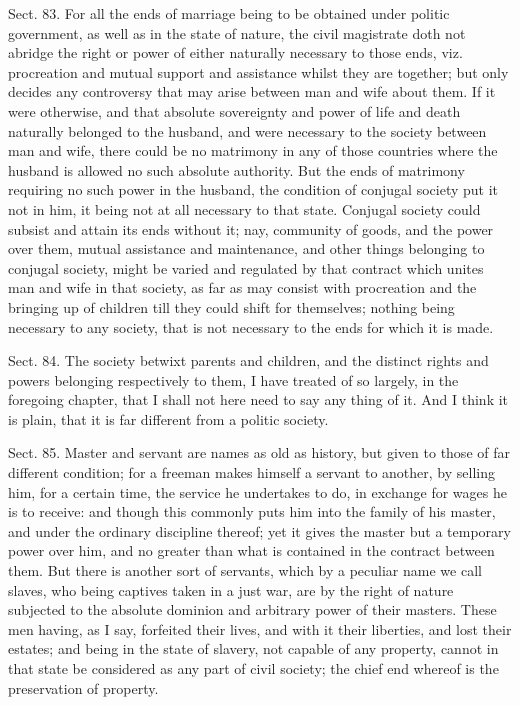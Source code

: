\documentclass[11pt,openany]{book}
\begin{document}
Sect. 83. For all the ends of marriage being to be obtained under politic government, as well as in the state of nature, the civil magistrate doth not abridge the right or power of either naturally necessary to those ends, viz. procreation and mutual support and assistance whilst they are together; but only decides any controversy that may arise between man and wife about them. If it were otherwise, and that absolute sovereignty and power of life and death naturally belonged to the husband, and were necessary to the society between man and wife, there could be no matrimony in any of those countries where the husband is allowed no such absolute authority. But the ends of matrimony requiring no such power in the husband, the condition of conjugal society put it not in him, it being not at all necessary to that state. Conjugal society could subsist and attain its ends without it; nay, community of goods, and the power over them, mutual assistance and maintenance, and other things belonging to conjugal society, might be varied and regulated by that contract which unites man and wife in that society, as far as may consist with procreation and the bringing up of children till they could shift for themselves; nothing being necessary to any society, that is not necessary to the ends for which it is made.

Sect. 84. The society betwixt parents and children, and the distinct rights and powers belonging respectively to them, I have treated of so largely, in the foregoing chapter, that I shall not here need to say any thing of it. And I think it is plain, that it is far different from a politic society.

Sect. 85. Master and servant are names as old as history, but given to those of far different condition; for a freeman makes himself a servant to another, by selling him, for a certain time, the service he undertakes to do, in exchange for wages he is to receive: and though this commonly puts him into the family of his master, and under the ordinary discipline thereof; yet it gives the master but a temporary power over him, and no greater than what is contained in the contract between them. But there is another sort of servants, which by a peculiar name we call slaves, who being captives taken in a just war, are by the right of nature subjected to the absolute dominion and arbitrary power of their masters. These men having, as I say, forfeited their lives, and with it their liberties, and lost their estates; and being in the state of slavery, not capable of any property, cannot in that state be considered as any part of civil society; the chief end whereof is the preservation of property.
\end{document}
